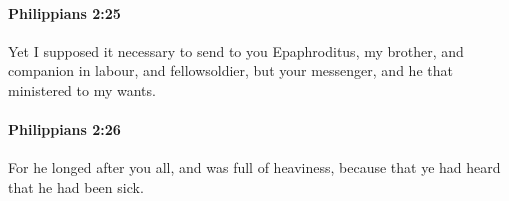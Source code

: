 		\paragraph{Philippians 2:25} %
			\label{PHILIPPIANS-2-25}

			Yet I supposed it necessary to send to you Epaphroditus, my brother, and companion in labour, and fellowsoldier, but your messenger, and he that ministered to my wants.

			\begin{framed}
			\scriptsize
				\begin{compactdesc}
					\item[SBLG] 
				\end{compactdesc}
			\end{framed}

		\paragraph{Philippians 2:26} %
			\label{PHILIPPIANS-2-26}

			For he longed after you all, and was full of heaviness, because that ye had heard that he had been sick.

